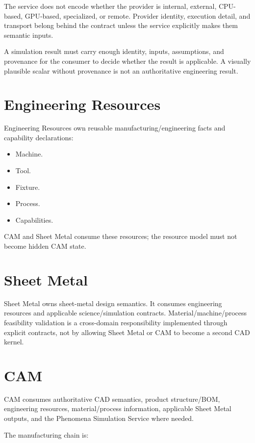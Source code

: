 \documentclass[11pt,a4paper]{report}
\begin{document}
The service does not encode whether the provider is internal, external, CPU-based, GPU-based, specialized, or remote. Provider identity, execution detail, and transport belong behind the contract unless the service explicitly makes them semantic inputs.

A simulation result must carry enough identity, inputs, assumptions, and provenance for the consumer to decide whether the result is applicable. A visually plausible scalar without provenance is not an authoritative engineering result.

\section{Engineering Resources}

Engineering Resources own reusable manufacturing/engineering facts and capability declarations:

\begin{itemize}
\item Machine.
\item Tool.
\item Fixture.
\item Process.
\item Capabilities.
\end{itemize}

CAM and Sheet Metal consume these resources; the resource model must not become hidden CAM state.

\section{Sheet Metal}

Sheet Metal owns sheet-metal design semantics. It consumes engineering resources and applicable science/simulation contracts. Material/machine/process feasibility validation is a cross-domain responsibility implemented through explicit contracts, not by allowing Sheet Metal or CAM to become a second CAD kernel.

\section{CAM}

CAM consumes authoritative CAD semantics, product structure/BOM, engineering resources, material/process information, applicable Sheet Metal outputs, and the Phenomena Simulation Service where needed.

The manufacturing chain is:
\end{document}
